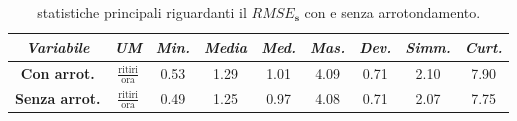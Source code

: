 \begin{table}[htpb]
	\centering
	\renewcommand\arraystretch{1.5}
	\begin{tabular}{c|c|c|c|c|c|c|c|c}
		\hline
		\textit{Variabile} & \textit{UM} & \textit{Min.} & \textit{Media} & \textit{Med.} & \textit{Mas.} & \textit{Dev.} & \textit{Simm.}  & \textit{Curt.} \\
		\hline
		\textbf{Con arrot.} & $\frac{\text{ritiri}}{\text{ora}}$ & \num{0.53} & \num{1.29} & \num{1.01} & \num{4.09} & \num{0.71} & \num{2.10} & \num{7.90} \\
		\hline
		\textbf{Senza arrot.} & $\frac{\text{ritiri}}{\text{ora}}$ & \num{0.49} & \num{1.25} & \num{0.97} & \num{4.08} & \num{0.71} & \num{2.07} & \num{7.75} \\
		\hline
	\end{tabular}
	\caption[Statistiche principali riguardanti il $RMSE_\mathbf{s}$ con e senza arrotondamento]{statistiche principali riguardanti il $RMSE_\mathbf{s}$ con e senza arrotondamento.}
	\label{statistiche_RMSE_s}
\end{table} 

